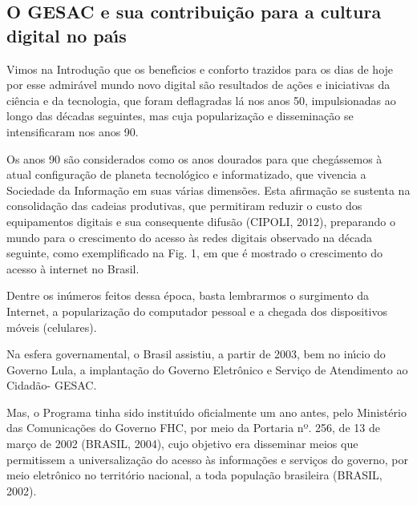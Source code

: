 \documentclass[
12pt,		%
openright,	%
twoside,  %
a4paper,			%
chapter=TITLE,		%
english,			%
french,				%
spanish,			%
brazil				%
]{USPSC-classe/USPSC}
\begin{document}
\subsection[O GESAC e sua contribui\c{c}\~ao para  a cultura  digital  no pa\'{\i}s]{O GESAC e sua contribui\c{c}\~ao para  a cultura  digital  no pa\'{\i}s}\label{O GESAC e sua contribui\c{c}\~ao para  a cultura  digital  no pa\'{\i}s}
Vimos na Introdu\c{c}\~ao que os benef\'{\i}cios e conforto trazidos para os dias de hoje por esse admir\'avel mundo novo digital s\~ao resultados de a\c{c}\~oes e iniciativas da ci\^encia e da tecnologia, que foram deflagradas l\'a nos anos 50, impulsionadas ao longo das d\'ecadas seguintes, mas cuja populariza\c{c}\~ao e dissemina\c{c}\~ao se intensificaram nos anos 90.









Os anos 90 s\~ao considerados como os anos dourados para que cheg\'assemos \`a atual configura\c{c}\~ao de planeta tecnol\'ogico e informatizado, que vivencia a Sociedade da Informa\c{c}\~ao em suas v\'arias dimens\~oes. Esta afirma\c{c}\~ao se sustenta na consolida\c{c}\~ao das cadeias produtivas, que permitiram reduzir o custo dos equipamentos digitais e sua consequente difus\~ao (CIPOLI, 2012), preparando o mundo para o crescimento do acesso \`as redes digitais observado na d\'ecada seguinte, como exemplificado na Fig. 1, em que \'e mostrado o crescimento do acesso \`a internet no Brasil.









Dentre os  in\'umeros feitos dessa \'epoca, basta lembrarmos o surgimento da Internet, a populariza\c{c}\~ao do computador pessoal e a chegada dos dispositivos m\'oveis (celulares).









Na esfera governamental, o Brasil assistiu, a partir de 2003, bem no in\'{\i}cio do Governo Lula, a implanta\c{c}\~ao do Governo Eletr\^onico e Servi\c{c}o de Atendimento ao Cidad\~ao- GESAC.









Mas, o Programa tinha sido institu\'{\i}do oficialmente um ano antes, pelo Minist\'erio das Comunica\c{c}\~oes do Governo FHC, por meio  da Portaria nº. 256, de 13 de mar\c{c}o de 2002 (BRASIL, 2004), cujo  objetivo era disseminar meios que permitissem a universaliza\c{c}\~ao do acesso \`as informa\c{c}\~oes e servi\c{c}os do governo, por meio eletr\^onico no territ\'orio nacional, a toda popula\c{c}\~ao brasileira (BRASIL, 2002).
\end{document}
